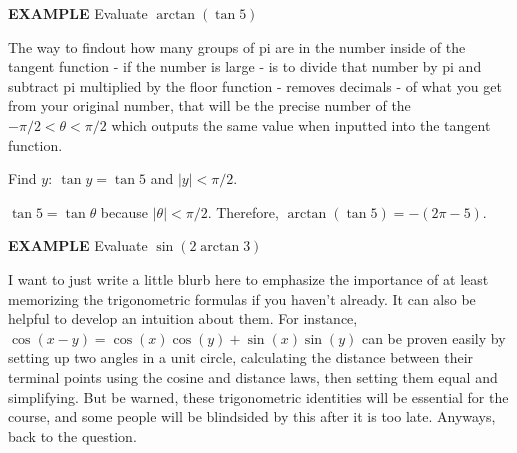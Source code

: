 \documentclass{article}
\begin{document}
{\bf{}EXAMPLE} Evaluate $\arctan(\tan5)$

\vspace{10pt}

The way to findout how many groups of pi are in the number inside of the tangent function - if the number is large - is to divide that number by pi and subtract pi multiplied by the floor function - removes decimals - of what you get from your original number, that will be the precise number of the $-\pi/2<\theta<\pi/2$ which outputs the same value when inputted into the tangent function. 

\vspace{10pt}

Find $y:\ \tan y=\tan5$ and $|y|<\pi/2$.

\begin{center}
\end{center}

\vspace{10pt}

$\tan5=\tan\theta$ because $|\theta|<\pi/2$. Therefore, $\arctan(\tan5)=-(2\pi-5)$.

\vspace{10pt}

{\bf{}EXAMPLE} Evaluate $\sin(2\arctan3)$

\vspace{10pt}

I want to just write a little blurb here to emphasize the importance of at least memorizing the trigonometric formulas if you haven't already. It can also be helpful to develop an intuition about them. For instance, $\cos(x-y)=\cos(x)\cos(y)+\sin(x)\sin(y)$ can be proven easily by setting up two angles in a unit circle, calculating the distance between their terminal points using the cosine and distance laws, then setting them equal and simplifying. But be warned, these trigonometric identities will be essential for the course, and some people will be blindsided by this after it is too late. Anyways, back to the question.
\end{document}
